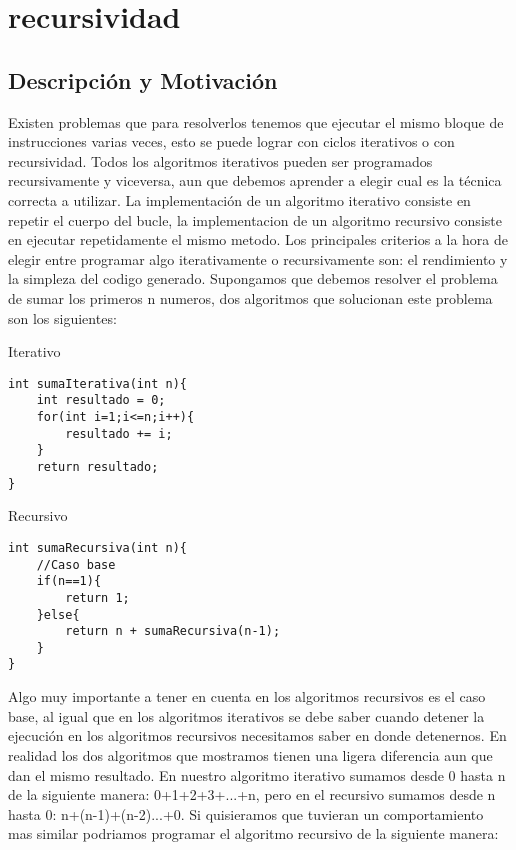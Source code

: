 \chapter{recursividad}
\section{Descripción y Motivación}

Existen problemas que para resolverlos tenemos que ejecutar el mismo bloque de instrucciones
varias veces, esto se puede lograr con ciclos iterativos o con recursividad. Todos los algoritmos
iterativos pueden ser programados recursivamente y viceversa, aun que debemos aprender a elegir
cual es la técnica correcta a utilizar. La implementación de un algoritmo iterativo consiste en repetir
el cuerpo del bucle, la implementacion de un algoritmo recursivo consiste en ejecutar repetidamente
el mismo metodo.
Los principales criterios a la hora de elegir entre programar algo iterativamente o recursivamente
son: el rendimiento y la simpleza del codigo generado.
Supongamos que debemos resolver el problema de sumar los primeros n numeros, dos algoritmos que
solucionan este problema son los siguientes:

\begin{minipage}{\textwidth}
Iterativo 
\begin{lstlisting}[style=C,caption=sumaIterativa.cpp]
int sumaIterativa(int n){
    int resultado = 0;
    for(int i=1;i<=n;i++){
        resultado += i;
    }
    return resultado;
}
\end{lstlisting}
\end{minipage}

\begin{minipage}{\textwidth}
Recursivo
\begin{lstlisting}[style=C,caption=sumaRecursiva.cpp]
int sumaRecursiva(int n){
    //Caso base
    if(n==1){
        return 1;
    }else{
        return n + sumaRecursiva(n-1);
    }
}
\end{lstlisting}
\end{minipage}

Algo muy importante a tener en cuenta en los algoritmos recursivos es el caso base, al igual que
en los algoritmos iterativos se debe saber cuando detener la ejecución en los algoritmos recursivos
necesitamos saber en donde detenernos.
En realidad los dos algoritmos que mostramos tienen una ligera
diferencia aun que dan el mismo resultado. En nuestro algoritmo iterativo sumamos desde 0 hasta n de la
siguiente manera: 0+1+2+3+...+n, pero en el recursivo sumamos desde n hasta 0: n+(n-1)+(n-2)...+0.
Si quisieramos que tuvieran un comportamiento mas similar podriamos programar el algoritmo recursivo
de la siguiente manera:

